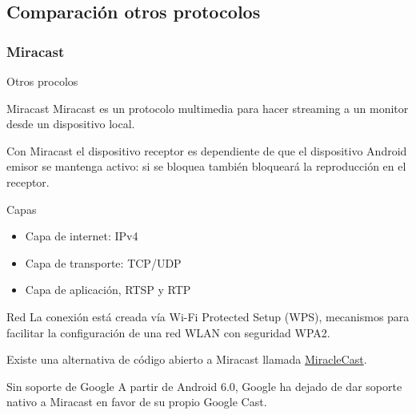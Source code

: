 \subsection{Comparación otros protocolos}

\subsubsection{Miracast}

\begin{frame}{Otros procolos}
	\begin{block}{Miracast}
		Miracast es un protocolo multimedia para hacer streaming a un monitor desde un dispositivo local.

		Con Miracast el dispositivo receptor es dependiente de que el dispositivo Android emisor se mantenga activo: si se bloquea también bloqueará la reproducción en el receptor.
	\end{block}
	
	\begin{block}{Capas}
		\begin{itemize}
			\item Capa de internet: IPv4
			\item Capa de transporte: TCP/UDP
			\item Capa de aplicación, RTSP y RTP
		\end{itemize}
	\end{block}
\end{frame}

\begin{frame}
	\begin{block}{Red}
		La conexión está creada vía Wi-Fi Protected Setup
		(WPS), mecanismos para facilitar la configuración de
		una red WLAN con seguridad WPA2.
		
		Existe una alternativa de código abierto a Miracast llamada \href{https://github.com/albfan/miraclecast}{MiracleCast}.
	\end{block}
	
	\begin{alertblock}{Sin soporte de Google}
		A partir de Android 6.0, Google ha dejado de dar soporte nativo a Miracast en favor de su propio Google Cast.
	\end{alertblock}
\end{frame}
